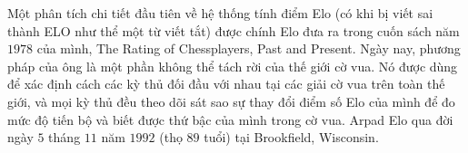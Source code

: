 \begin{tBox}
	\vskip 0.05cm
	Một phân tích chi tiết đầu tiên về hệ thống tính điểm Elo (có khi bị viết sai thành ELO như thể một từ viết tắt) được chính Elo đưa ra trong cuốn sách năm $1978$ của mình, The Rating of Chessplayers, Past and Present. Ngày nay, phương pháp của ông là một phần không thể tách rời của thế giới cờ vua. Nó được dùng để xác định cách các kỳ thủ đối đầu với nhau tại các giải cờ vua trên toàn thế giới, và mọi kỳ thủ đều theo dõi sát sao sự thay đổi điểm số Elo của mình để đo mức độ tiến bộ và biết được thứ bậc của mình trong cờ vua.
	\vskip 0.05cm
	Arpad Elo qua đời ngày $5$ tháng $11$ năm $1992$ (thọ $89$ tuổi) tại Brookfield, Wisconsin.
	\vspace*{-5pt}
\end{tBox}